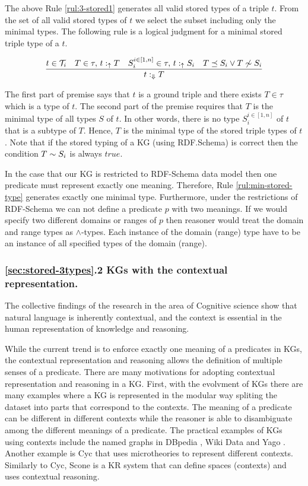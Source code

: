 \documentclass[runningheads]{llncs}
\newcommand{\uarr}{\uparrow}
\newcommand{\Darr}{\Downarrow}
\newcommand{\T}{{\cal T}}
\begin{document}
The above Rule \ref{rul:3-stored1} generates all valid stored types of
a triple $t$. From the set of all valid stored types of $t$ we select
the subset including only the minimal types. The following rule is a
logical judgment for a minimal stored triple type of a $t$. 

\begin{equation}
\label{rul:min-stored-type}
\dfrac{t\in\T_i\quad T\in\tau,\, t:_\uarr\/T\quad\/S_i^{i\in[1,n]}\in\tau,\, t:_\uarr\/S_i\quad T\preceq\/S_i\lor\/T\not\sim\/S_i}
      {t:_{\Darr}\/T}
\end{equation}

The first part of premise says that $t$ is a ground triple and there
exists $T\in\tau$ which is a type of $t$. The second part of the
premise requires that $T$ is the minimal type of all types $S$ of
$t$. In other words, there is no type $S_i^{i\in[1,n]}$ of $t$ that is
a subtype of $T$. Hence, $T$ is the minimal type of the stored triple
types of $t$. Note that if the stored typing of a KG (using
RDF.Schema) is correct then the condition $T\sim\/S_i$ is always
$true$.

In the case that our KG is restricted to RDF-Schema data model then
one predicate must represent exactly one meaning. Therefore, Rule
\ref{rul:min-stored-type} generates exactly one minimal
type. Furthermore, under the restrictions of RDF-Schema we can not
define a predicate $p$ with two meanings. If we would specify two
different domains or ranges of $p$ then reasoner would treat the
domain and range types as $\land$-types. Each instance of the domain
(range) type have to be an instance of all specified types of the
domain (range).

\subsubsection{\ref{sec:stored-3types}.2 KGs with the contextual representation.}

The collective findings of the research in the area of Cognitive
science \cite{Hollister2017} show that natural language is inherently
contextual, and the context is essential in the human representation
of knowledge and reasoning. 

While the current trend is to enforce exactly one meaning of a
predicates in KGs, the contextual representation and reasoning allows
the definition of multiple senses of a predicate. There are many
motivations for adopting contextual representation and reasoning in a
KG. First, with the evolvment of KGs there are many examples where a
KG is represented in the modular way spliting the dataset into parts
that correspond to the contexts. The meaning of a predicate can be
different in different contexts while the reasoner is able to
disambiguate among the different meanings of a predicate.
The practical examples of KGs using contexts include the named graphs
in DBpedia \cite{Auer2007}, Wiki Data \cite{vrandecic2014} and Yago
\cite{Hoffart2013}. Another example is Cyc \cite{cyc} that uses
microtheories to represent different contexts. Similarly to Cyc, Scone
\cite{Fahlman2011} is a KR system that can define spaces (contexts)
and uses contextual reasoning.
\end{document}
